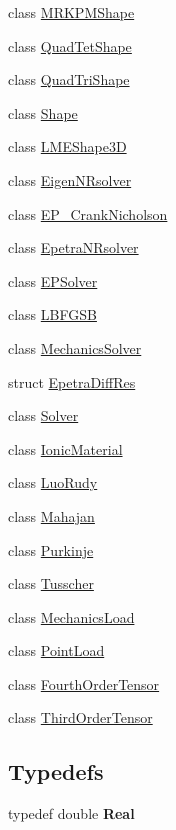 \begin{DoxyCompactItemize}
class \hyperlink{classvoom_1_1_m_r_k_p_m_shape}{MRKPMShape}
\item 
class \hyperlink{classvoom_1_1_quad_tet_shape}{QuadTetShape}
\item 
class \hyperlink{classvoom_1_1_quad_tri_shape}{QuadTriShape}
\item 
class \hyperlink{classvoom_1_1_shape}{Shape}
\item 
class \hyperlink{classvoom_1_1_l_m_e_shape3_d}{LMEShape3D}
\item 
class \hyperlink{classvoom_1_1_eigen_n_rsolver}{EigenNRsolver}
\item 
class \hyperlink{classvoom_1_1_e_p___crank_nicholson}{EP\_\-CrankNicholson}
\item 
class \hyperlink{classvoom_1_1_epetra_n_rsolver}{EpetraNRsolver}
\item 
class \hyperlink{classvoom_1_1_e_p_solver}{EPSolver}
\item 
class \hyperlink{classvoom_1_1_l_b_f_g_s_b}{LBFGSB}
\item 
class \hyperlink{classvoom_1_1_mechanics_solver}{MechanicsSolver}
\item 
struct \hyperlink{structvoom_1_1_epetra_diff_res}{EpetraDiffRes}
\item 
class \hyperlink{classvoom_1_1_solver}{Solver}
\item 
class \hyperlink{classvoom_1_1_ionic_material}{IonicMaterial}
\item 
class \hyperlink{classvoom_1_1_luo_rudy}{LuoRudy}
\item 
class \hyperlink{classvoom_1_1_mahajan}{Mahajan}
\item 
class \hyperlink{classvoom_1_1_purkinje}{Purkinje}
\item 
class \hyperlink{classvoom_1_1_tusscher}{Tusscher}
\item 
class \hyperlink{classvoom_1_1_mechanics_load}{MechanicsLoad}
\item 
class \hyperlink{classvoom_1_1_point_load}{PointLoad}
\item 
class \hyperlink{classvoom_1_1_fourth_order_tensor}{FourthOrderTensor}
\item 
class \hyperlink{classvoom_1_1_third_order_tensor}{ThirdOrderTensor}
\end{DoxyCompactItemize}
\subsection*{Typedefs}
\begin{DoxyCompactItemize}
\item 
\hypertarget{namespacevoom_aedfa692843b69f9b9dca12ef77388d57}{
typedef double {\bfseries Real}}
\label{namespacevoom_aedfa692843b69f9b9dca12ef77388d57}

\end{DoxyCompactItemize}
